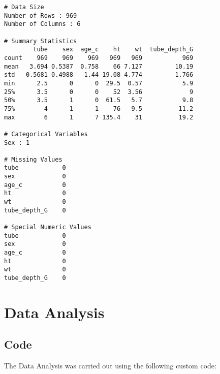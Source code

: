 \documentclass[11pt]{article}
\begin{document}
\begin{Verbatim}[tabsize=4]
# Data Size
Number of Rows : 969
Number of Columns : 6

# Summary Statistics
        tube    sex  age_c    ht    wt  tube_depth_G
count    969    969    969   969   969           969
mean   3.694 0.5387  0.758    66 7.127         10.19
std   0.5681 0.4988   1.44 19.08 4.774         1.766
min      2.5      0      0  29.5  0.57           5.9
25%      3.5      0      0    52  3.56             9
50%      3.5      1      0  61.5   5.7           9.8
75%        4      1      1    76   9.5          11.2
max        6      1      7 135.4    31          19.2

# Categorical Variables
Sex : 1

# Missing Values
tube            0
sex             0
age_c           0
ht              0
wt              0
tube_depth_G    0

# Special Numeric Values
tube            0
sex             0
age_c           0
ht              0
wt              0
tube_depth_G    0

\end{Verbatim}

\section{Data Analysis}
\subsection{{Code}}
The Data Analysis was carried out using the following custom code:
\end{document}
